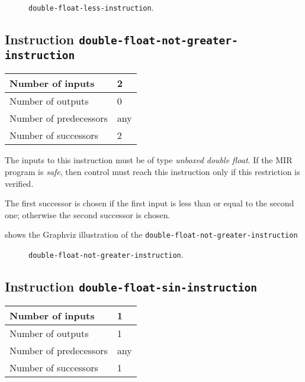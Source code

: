 \begin{figure}
\begin{center}
\end{center}
\caption{\label{fig-double-float-less-instruction}
\texttt{double-float-less-instruction}.}
\end{figure}

\subsection{Instruction \texttt{double-float-not-greater-instruction}}
\label{mir-instruction-double-float-not-greater}

\begin{tabular}{|l|l|}
\hline
Number of inputs & 2\\
\hline
Number of outputs & 0\\
\hline
Number of predecessors & any\\
\hline
Number of successors & 2\\
\hline
\end{tabular}

The inputs to this instruction must be of type \emph{unboxed double
  float}.  If the MIR program is \emph{safe}, then control must reach
this instruction only if this restriction is verified.

The first successor is chosen if the first input is less than or equal
to the second one; otherwise the second successor is chosen.

 shows the Graphviz illustration of the
\texttt{double-float-not-greater-instruction}

\begin{figure}
\begin{center}
\end{center}
\caption{\label{fig-double-float-not-greater-instruction}
\texttt{double-float-not-greater-instruction}.}
\end{figure}

\subsection{Instruction \texttt{double-float-sin-instruction}}
\label{mir-instruction-double-float-div}

\begin{tabular}{|l|l|}
\hline
Number of inputs & 1\\
\hline
Number of outputs & 1\\
\hline
Number of predecessors & any\\
\hline
Number of successors & 1\\
\hline
\end{tabular}

